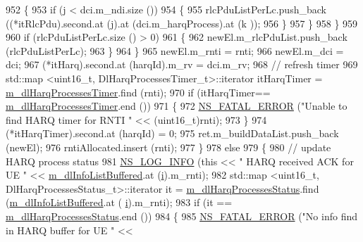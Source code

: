 \begin{DoxyCode}
952                     \{
953                       \textcolor{keywordflow}{if} (j < dci.m\_ndi.size ())
954                         \{
955                           rlcPduListPerLc.push\_back ((*itRlcPdu).second.at (j).at (dci.m\_harqProcess).at (k
      ));
956                         \}
957                     \}
958                 \}
959 
960               \textcolor{keywordflow}{if} (rlcPduListPerLc.size () > 0)
961                 \{
962                   newEl.m\_rlcPduList.push\_back (rlcPduListPerLc);
963                 \}
964             \}
965           newEl.m\_rnti = rnti;
966           newEl.m\_dci = dci;
967           (*itHarq).second.at (harqId).m\_rv = dci.m\_rv;
968           \textcolor{comment}{// refresh timer}
969           std::map <uint16\_t, DlHarqProcessesTimer\_t>::iterator itHarqTimer = 
      \hyperlink{classns3_1_1TtaFfMacScheduler_ac17ab46a13a0d51459cc7b1d7e5ebc06}{m\_dlHarqProcessesTimer}.find (rnti);
970           \textcolor{keywordflow}{if} (itHarqTimer== \hyperlink{classns3_1_1TtaFfMacScheduler_ac17ab46a13a0d51459cc7b1d7e5ebc06}{m\_dlHarqProcessesTimer}.end ())
971             \{
972               \hyperlink{group__fatal_ga5131d5e3f75d7d4cbfd706ac456fdc85}{NS\_FATAL\_ERROR} (\textcolor{stringliteral}{"Unable to find HARQ timer for RNTI "} << (uint16\_t)rnti);
973             \}
974           (*itHarqTimer).second.at (harqId) = 0;
975           ret.m\_buildDataList.push\_back (newEl);
976           rntiAllocated.insert (rnti);
977         \}
978       \textcolor{keywordflow}{else}
979         \{
980           \textcolor{comment}{// update HARQ process status}
981           \hyperlink{group__logging_gafbd73ee2cf9f26b319f49086d8e860fb}{NS\_LOG\_INFO} (\textcolor{keyword}{this} << \textcolor{stringliteral}{" HARQ received ACK for UE "} << 
      \hyperlink{classns3_1_1TtaFfMacScheduler_af7afa3d5a610456175b21bad17cc04ae}{m\_dlInfoListBuffered}.at (\hyperlink{bernuolliDistribution_8m_a6f6ccfcf58b31cb6412107d9d5281426}{i}).m\_rnti);
982           std::map <uint16\_t, DlHarqProcessesStatus\_t>::iterator it = 
      \hyperlink{classns3_1_1TtaFfMacScheduler_a7fca472047b1f964ac6e2b992ed93f66}{m\_dlHarqProcessesStatus}.find (\hyperlink{classns3_1_1TtaFfMacScheduler_af7afa3d5a610456175b21bad17cc04ae}{m\_dlInfoListBuffered}.at (
      \hyperlink{bernuolliDistribution_8m_a6f6ccfcf58b31cb6412107d9d5281426}{i}).m\_rnti);
983           \textcolor{keywordflow}{if} (it == \hyperlink{classns3_1_1TtaFfMacScheduler_a7fca472047b1f964ac6e2b992ed93f66}{m\_dlHarqProcessesStatus}.end ())
984             \{
985               \hyperlink{group__fatal_ga5131d5e3f75d7d4cbfd706ac456fdc85}{NS\_FATAL\_ERROR} (\textcolor{stringliteral}{"No info find in HARQ buffer for UE "} << 

\end{DoxyCode}

